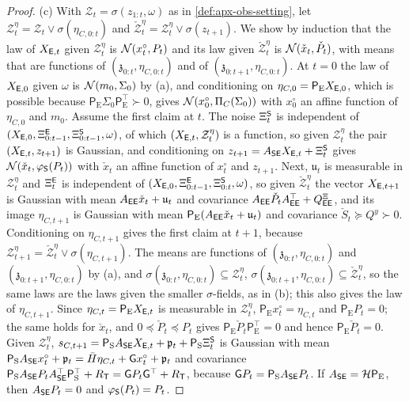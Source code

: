 \begin{proof}
(c) With $\mathcal Z_t=\sigma(z_{1:t},\omega)$ as in \cref{def:apx-obs-setting}, let $\mathcal Z^\eta_t=\mathcal Z_t\vee\sigma(\eta_{C,0:t})$ and $\check{\mathcal Z}^\eta_t=\mathcal Z^\eta_t\vee\sigma(z_{t+1})$. We show by induction that the law of $X_{\mathsf{E},t}$ given $\mathcal Z^\eta_t$ is $\mathcal{N}(x^\circ_t,P_t)$ and its law given $\check{\mathcal Z}^\eta_t$ is $\mathcal{N}(\check x_t,\check P_t)$, with means that are functions of $(\mathfrak z_{0:t},\eta_{C,0:t})$ and of $(\mathfrak z_{0:t+1},\eta_{C,0:t})$. At $t=0$ the law of $X_{\mathsf{E},0}$ given $\omega$ is $\mathcal{N}(m_0,\Sigma_0)$ by (a), and conditioning on $\eta_{C,0}=\mathsf P_{\mathrm E}X_{\mathsf{E},0}$, which is possible because $\mathsf P_{\mathrm E}\Sigma_0\mathsf P_{\mathrm E}^\top\succ0$, gives $\mathcal{N}(x^\circ_0,\Pi_C(\Sigma_0))$ with $x^\circ_0$ an affine function of $\eta_{C,0}$ and $m_0$. Assume the first claim at $t$. The noise $\Xi^{\mathsf{S}}_t$ is independent of $(X_{\mathsf{E},0},\Xi^{\mathsf{E}}_{0:t-1},\Xi^{\mathsf{S}}_{0:t-1},\omega)$, of which $(X_{\mathsf{E},t},\mathcal Z^\eta_t)$ is a function, so given $\mathcal Z^\eta_t$ the pair $(X_{\mathsf{E},t},z_{t+1})$ is Gaussian, and conditioning on $z_{t+1}=A_{\mathsf{S}\mathsf{E}}X_{\mathsf{E},t}+\Xi^{\mathsf{S}}_t$ gives $\mathcal{N}(\check x_t,\varphi_{\mathsf{S}}(P_t))$ with $\check x_t$ an affine function of $x^\circ_t$ and $z_{t+1}$. Next, $\mathfrak u_t$ is measurable in $\mathcal Z^\eta_t$ and $\Xi^{\mathsf{E}}_t$ is independent of $(X_{\mathsf{E},0},\Xi^{\mathsf{E}}_{0:t-1},\Xi^{\mathsf{S}}_{0:t},\omega)$, so given $\check{\mathcal Z}^\eta_t$ the vector $X_{\mathsf{E},t+1}$ is Gaussian with mean $A_{\mathsf{E}\mathsf{E}}\check x_t+\mathfrak u_t$ and covariance $A_{\mathsf{E}\mathsf{E}}\check P_tA_{\mathsf{E}\mathsf{E}}^\top+Q^{\Xi}_{\mathsf{E}\mathsf{E}}$, and its image $\eta_{C,t+1}$ is Gaussian with mean $\mathsf P_{\mathrm E}(A_{\mathsf{E}\mathsf{E}}\check x_t+\mathfrak u_t)$ and covariance $\check S_t\succeq Q^y\succ0$. Conditioning on $\eta_{C,t+1}$ gives the first claim at $t+1$, because $\mathcal Z^\eta_{t+1}=\check{\mathcal Z}^\eta_t\vee\sigma(\eta_{C,t+1})$. The means are functions of $(\mathfrak z_{0:t},\eta_{C,0:t})$ and $(\mathfrak z_{0:t+1},\eta_{C,0:t})$ by (a), and $\sigma(\mathfrak z_{0:t},\eta_{C,0:t})\subseteq\mathcal Z^\eta_t$, $\sigma(\mathfrak z_{0:t+1},\eta_{C,0:t})\subseteq\check{\mathcal Z}^\eta_t$, so the same laws are the laws given the smaller $\sigma$-fields, as in (b); this also gives the law of $\eta_{C,t+1}$. Since $\eta_{C,t}=\mathsf P_{\mathrm E}X_{\mathsf{E},t}$ is measurable in $\mathcal Z^\eta_t$, $\mathsf P_{\mathrm E}x^\circ_t=\eta_{C,t}$ and $\mathsf P_{\mathrm E}P_t=0$; the same holds for $\check x_t$, and $0\preceq\check P_t\preceq P_t$ gives $\mathsf P_{\mathrm E}\check P_t\mathsf P_{\mathrm E}^\top=0$ and hence $\mathsf P_{\mathrm E}\check P_t=0$. Given $\mathcal Z^\eta_t$, $s_{C,t+1}=\mathsf P_{\mathrm S}A_{\mathsf{S}\mathsf{E}}X_{\mathsf{E},t}+\mathfrak p_t+\mathsf P_{\mathrm S}\Xi^{\mathsf{S}}_t$ is Gaussian with mean $\mathsf P_{\mathrm S}A_{\mathsf{S}\mathsf{E}}x^\circ_t+\mathfrak p_t=\bar H\eta_{C,t}+\mathsf Gx^\circ_t+\mathfrak p_t$ and covariance $\mathsf P_{\mathrm S}A_{\mathsf{S}\mathsf{E}}P_tA_{\mathsf{S}\mathsf{E}}^\top\mathsf P_{\mathrm S}^\top+R_{\mathsf T}=\mathsf GP_t\mathsf G^\top+R_{\mathsf T}$, because $\mathsf GP_t=\mathsf P_{\mathrm S}A_{\mathsf{S}\mathsf{E}}P_t$. If $A_{\mathsf{S}\mathsf{E}}=\mathcal H\mathsf P_{\mathrm E}$, then $A_{\mathsf{S}\mathsf{E}}P_t=0$ and $\varphi_{\mathsf{S}}(P_t)=P_t$.


\end{proof}
